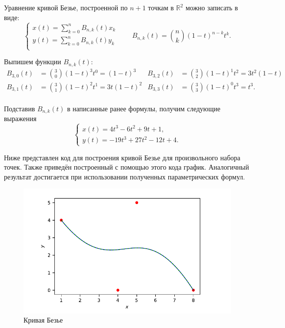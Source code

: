 Уравнение кривой Безье, построенной по $n+1$ точкам в $\mathbb{R}^2$ можно
записать в виде:
\begin{equation*}
    \begin{cases}
        x(t) = \sum_{k=0}^{n}{B_{n,k}(t) x_k}\\
        y(t) = \sum_{k=0}^{n}{B_{n,k}(t) y_k}\\
    \end{cases}
    \qquad
    B_{n,k}(t) = \binom{n}{k} (1-t)^{n-k} t^k.
\end{equation*}

Выпишем функции $B_{n,k}(t)$:
\begin{align*}
    B_{3,0}(t) &= \binom{3}{0} (1-t)^3 t^0 = (1-t)^3
    &
    B_{3,2}(t) &= \binom{3}{2} (1-t)^1 t^2 = 3t^2(1-t)\\
    B_{3,1}(t) &= \binom{3}{1} (1-t)^2 t^1 = 3t(1-t)^2
    &
    B_{3, 3}(t) &= \binom{3}{3} (1-t)^0 t^3 = t^3.\\
\end{align*}

Подставив $B_{n,k}(t)$ в написанные ранее формулы, получим следующие выражения
\begin{equation*}
    \begin{cases}
        x(t) = 4t^3 - 6t^2 + 9t + 1,\\
        y(t) = -19t^3 + 27t^2 - 12t + 4.
    \end{cases}
\end{equation*}

Ниже представлен код для построения кривой Безье для произвольного набора точек.
Также приведён построенный с помощью этого кода график. Аналогичный результат
достигается при использовании полученных параметрических формул.

\begin{figure}[hbt]
    \centering
    \includegraphics*[scale=1.0]{figures/ex4.pdf}
    \caption{Кривая Безье}
\end{figure}

